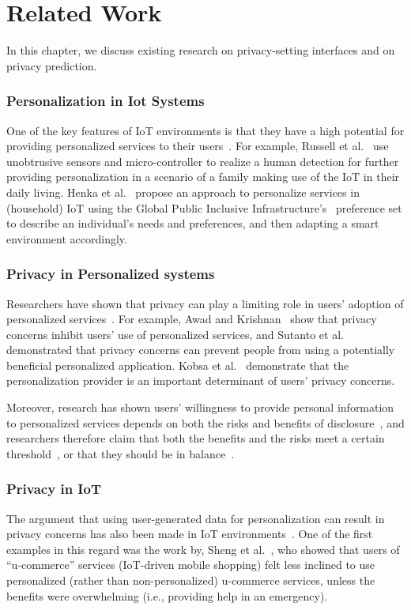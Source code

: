 \chapter{Related Work}\label{chapter:Relatedwork}
In this chapter, we discuss existing research on privacy-setting interfaces and on privacy prediction.

\subsection{Personalization in Iot Systems}
One of the key features of IoT environments is that they have a high potential for providing personalized services to their users~\cite{vallee2016personalization, etzion2014personalization, hemant2015internet}. For example, Russell et al.~\cite{russell2015personalization} use unobtrusive sensors and micro-controller to realize a human detection for further providing personalization in a scenario of a family making use of the IoT in their daily living. Henka et al.~\cite{henka2016personalizing} propose an approach to personalize services in (household) IoT using the Global Public Inclusive Infrastructure's~\cite{vanderheiden2011creating} preference set to describe an individual's needs and preferences, and then adapting a smart environment accordingly.

\subsection{Privacy in Personalized systems}
Researchers have shown that privacy can play a limiting role in users' adoption of personalized services~\cite{teltzrow_2004}.  For example, Awad and Krishnan~\cite{awad_2006} show that privacy concerns inhibit users' use of personalized services, and Sutanto et al.~\cite{sutanto_2013} demonstrated that privacy concerns can prevent people from using a potentially beneficial personalized application. Kobsa et al.~\cite{kobsa_2016} demonstrate that the personalization provider is an important determinant of users' privacy concerns.

Moreover, research has shown  users' willingness to provide personal information to personalized services depends on both the risks and benefits of disclosure~\cite{phelps_2000,ho_2006,hui_2006}, and researchers therefore claim that both the benefits and the risks meet a certain threshold~\cite{treiblmaier_2007}, or that they should be in balance~\cite{chellappa_2005}.

\subsection{Privacy in IoT}
The argument that using user-generated data for personalization can result in privacy concerns has also been made in IoT environments~\cite{worthy_trust_2016}. 
	One of the first examples in this regard was the work by, Sheng et al.~\cite{sheng_experimental_2008}, who showed that users of ``u-commerce'' services (IoT-driven mobile shopping) felt less inclined to use personalized (rather than non-personalized) u-commerce services, unless the benefits were overwhelming (i.e., providing help in an emergency).

